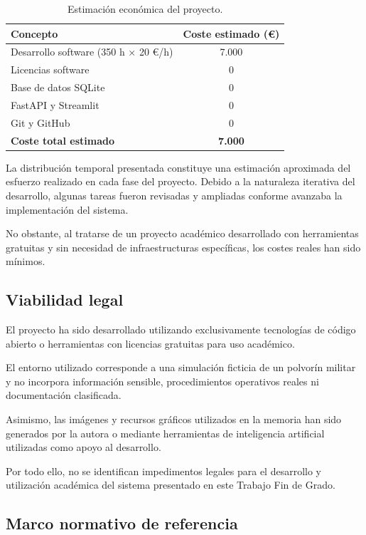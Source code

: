 \begin{table}[htbp]
	\centering
	\begin{tabular}{|l|c|}
		\hline
		\textbf{Concepto} & \textbf{Coste estimado (€)} \\
		\hline
		Desarrollo software (350 h × 20 €/h) & 7.000 \\
		Licencias software & 0 \\
		Base de datos SQLite & 0 \\
		FastAPI y Streamlit & 0 \\
		Git y GitHub & 0 \\
		\hline
		\textbf{Coste total estimado} & \textbf{7.000} \\
		\hline
	\end{tabular}
	\caption{Estimación económica del proyecto.}
\end{table}

La distribución temporal presentada constituye una estimación aproximada del esfuerzo realizado en cada fase del proyecto. Debido a la naturaleza iterativa del desarrollo, algunas tareas fueron revisadas y ampliadas conforme avanzaba la implementación del sistema.

No obstante, al tratarse de un proyecto académico desarrollado con herramientas gratuitas y sin necesidad de infraestructuras específicas, los costes reales han sido mínimos.

\subsection{Viabilidad legal}

El proyecto ha sido desarrollado utilizando exclusivamente tecnologías de código abierto o herramientas con licencias gratuitas para uso académico.

El entorno utilizado corresponde a una simulación ficticia de un polvorín militar y no incorpora información sensible, procedimientos operativos reales ni documentación clasificada.

Asimismo, las imágenes y recursos gráficos utilizados en la memoria han sido generados por la autora o mediante herramientas de inteligencia artificial utilizadas como apoyo al desarrollo.

Por todo ello, no se identifican impedimentos legales para el desarrollo y utilización académica del sistema presentado en este Trabajo Fin de Grado.

\subsection{Marco normativo de referencia}

